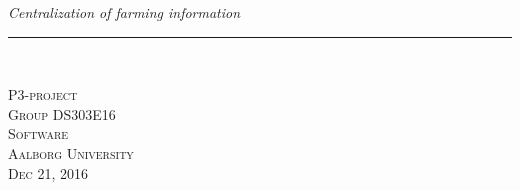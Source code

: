 \thispagestyle{empty}
\begin{center}
\vspace{3cm}

\phantom{hul}

\phantom{hul}

\phantom{hul}

\textsl{\Huge Centralization of farming information} \\ \vspace{1cm}

\rule{13cm}{3mm} \\ \vspace{1.5cm}
\vspace{1cm}


\vspace{2cm} 
\textsc{\Large P3-project \\
Group DS303E16 \\
Software\\
Aalborg University\\Dec 21, 2016\\}
\end{center}

